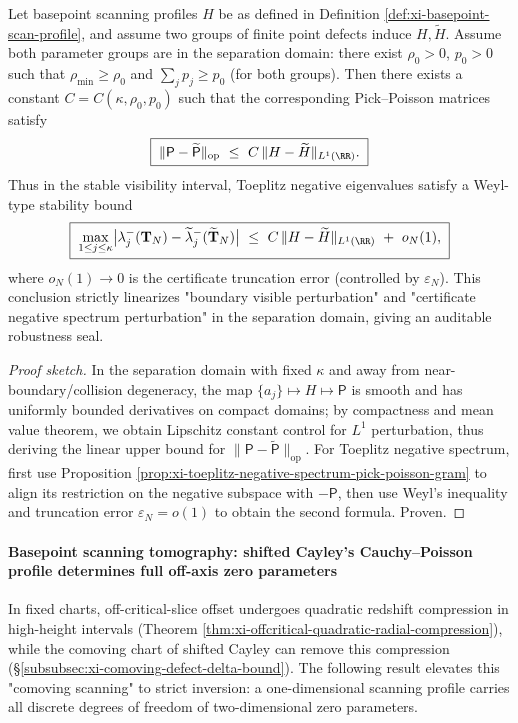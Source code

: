 \begin{proposition}\label{prop:xi-boundary-density-perturbation-spectral-stability}
Let basepoint scanning profiles \(H\) be as defined in Definition \ref{def:xi-basepoint-scan-profile}, and assume two groups of finite point defects induce \(H,\widetilde H\).
Assume both parameter groups are in the separation domain: there exist \(\rho_0>0\), \(p_0>0\) such that
\(
\rho_{\min}\ge \rho_0
\)
and
\(
\sum_j p_j\ge p_0
\)
(for both groups).
Then there exists a constant \(C=C(\kappa,\rho_0,p_0)\) such that the corresponding Pick--Poisson matrices satisfy
\[
\boxed{\;
\|\mathsf P-\widetilde{\mathsf P}\|_{\mathrm{op}}
\ \le\ C\,\|H-\widetilde H\|_{L^1(\RR)}.\;}
\]
Thus in the stable visibility interval, Toeplitz negative eigenvalues satisfy a Weyl-type stability bound
\[
\boxed{\;
\max_{1\le j\le\kappa}\bigl|\lambda_j^{-}(\mathbf{T}_N)-\widetilde\lambda_j^{-}(\widetilde{\mathbf{T}}_N)\bigr|
\ \le\ C\,\|H-\widetilde H\|_{L^1(\RR)}\ +\ o_N(1),\;}
\]
where \(o_N(1)\to 0\) is the certificate truncation error (controlled by \(\varepsilon_N\)).
This conclusion strictly linearizes "boundary visible perturbation" and "certificate negative spectrum perturbation" in the separation domain, giving an auditable robustness seal.
\end{proposition}
\begin{proof}[Proof sketch]
In the separation domain with fixed \(\kappa\) and away from near-boundary/collision degeneracy, the map \(\{a_j\}\mapsto H\mapsto \mathsf P\) is smooth and has uniformly bounded derivatives on compact domains;
by compactness and mean value theorem, we obtain Lipschitz constant control for \(L^1\) perturbation, thus deriving the linear upper bound for \(\|\mathsf P-\widetilde{\mathsf P}\|_{\mathrm{op}}\).
For Toeplitz negative spectrum, first use Proposition \ref{prop:xi-toeplitz-negative-spectrum-pick-poisson-gram} to align its restriction on the negative subspace with \(-\mathsf P\), then use Weyl's inequality and truncation error \(\varepsilon_N=o(1)\) to obtain the second formula. Proven.
\end{proof}



\paragraph{Basepoint scanning tomography: shifted Cayley's Cauchy--Poisson profile determines full off-axis zero parameters}
In fixed charts, off-critical-slice offset undergoes quadratic redshift compression in high-height intervals (Theorem \ref{thm:xi-offcritical-quadratic-radial-compression}), while the comoving chart of shifted Cayley can remove this compression (\S\ref{subsubsec:xi-comoving-defect-delta-bound}).
The following result elevates this "comoving scanning" to strict inversion: a one-dimensional scanning profile carries all discrete degrees of freedom of two-dimensional zero parameters.

